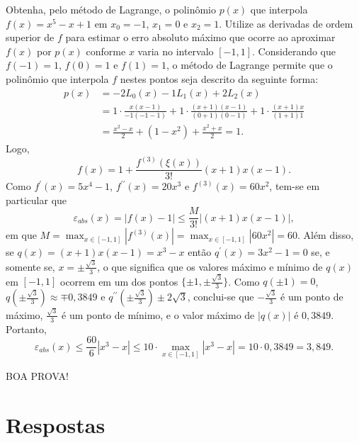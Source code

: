 \documentclass[12pt,a4paper]{article}
\begin{document}
\begin{ExerciseList}
\Exercise[title={2,0}]
Obtenha, pelo método de Lagrange, o polinômio $p(x)$ que interpola $f(x) = x^5 - x + 1$ em $x_0 = -1$, $x_1 = 0$ e $x_2 = 1$. Utilize as derivadas de ordem superior de $f$ para estimar o erro absoluto máximo que ocorre ao aproximar $f(x)$ por $p(x)$ conforme $x$ varia no intervalo $[-1, 1]$.
\Answer Considerando que $f(-1) = 1$, $f(0) = 1$ e $f(1) = 1$, o método de Lagrange permite que o polinômio que interpola $f$ nestes pontos seja descrito da seguinte forma:
\begin{align*}
p(x)
& = -2 L_0(x) -1 L_1(x) + 2 L_2(x) \\
& = 1 \cdot \frac{x(x-1)}{-1(-1-1)}
  + 1 \cdot \frac{(x+1)(x-1)}{(0+1)(0-1)}
  + 1 \cdot \frac{(x+1)x}{(1+1)1}\\
& = \frac{x^2-x}{2}
    + (1-x^2)
    + \frac{x^2+x}{2} = 1.
\end{align*}
Logo,
\[
f(x) = 1 + \frac{f^{(3)}(\xi(x))}{3!}(x+1)x(x-1).
\]
Como $f^\prime(x) = 5x^4-1$, $f^{\prime\prime}(x) = 20x^3$ e $f^{(3)}(x) = 60x^2$, tem-se em particular que
\[
\varepsilon_{abs}(x)
= \left|f(x) - 1\right|
\leq \frac{M}{3!} \left|(x+1)x(x-1)\right|,
\]
em que $M
= \max_{x \in [-1,1]} \left|f^{(3)}(x)\right|
= \max_{x \in [-1,1]} \left|60x^2\right|
= 60$. Além disso, se $q(x) = (x+1)x(x-1) = x^3-x$ então $q^\prime(x) = 3x^2-1 = 0$ se, e somente se, $x = \pm\frac{\sqrt{3}}{3}$, o que significa que os valores máximo e mínimo de $q(x)$ em $[-1,1]$ ocorrem em um dos pontos $\{ \pm1, \pm\frac{\sqrt{3}}{3} \}$. Como $q(\pm1) = 0$, $q(\pm\frac{\sqrt{3}}{3}) \approx \mp0,3849$ e $q^{\prime\prime}(\pm\frac{\sqrt{3}}{3}) \pm 2\sqrt{3}$, conclui-se que $-\frac{\sqrt{3}}{3}$ é um ponto de máximo, $\frac{\sqrt{3}}{3}$ é um ponto de mínimo, e o valor máximo de $|q(x)|$ é $0,3849$. Portanto,
\[
\varepsilon_{abs}(x)
\leq \frac{60}{6} \left|x^3 - x\right|
\leq 10 \cdot \max_{x \in [-1,1]} \left|x^3 - x\right|
= 10 \cdot 0,3849
= 3,849.
\]
\end{ExerciseList}

\begin{center}
BOA PROVA!
\end{center}

\newpage
\restoregeometry
\section*{Respostas}
\shipoutAnswer
\end{document}
